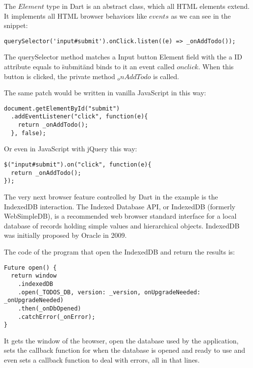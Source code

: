 The $Element$ type in Dart \cite{4_9} is an
abstract class, which all HTML elements extend. It implements all HTML browser
behaviors like $events$ as we can see in the snippet:

\begin{verbatim}
querySelector('input#submit').onClick.listen((e) => _onAddTodo());  
\end{verbatim}

The querySelector method matches a Input button Element field with the a ID
attribute equals to \"submit\" and binds to it an event called $onclick$. When
this button is clicked, the private method $_onAddTodo$ is called.

The same patch would be written in vanilla JavaScript in this way:

\begin{lstlisting}[label=jset,caption=Vanilla JavaScript translation]
document.getElementById("submit")
  .addEventListener("click", function(e){
    return _onAddTodo();
  }, false);
\end{lstlisting}

Or even in JavaScript with jQuery this way:

\begin{lstlisting}[label=jjqt,caption=JavaScript with jQuery translation]
$("input#submit").on("click", function(e){
  return _onAddTodo();
});
\end{lstlisting}

The very next browser feature controlled by Dart in the example is the
IndexedDB \cite{4_10} interaction. The Indexed
Database API, or IndexedDB (formerly  WebSimpleDB), is a recommended web browser
standard interface for a local database of records holding simple values and
hierarchical objects. IndexedDB was initially proposed by Oracle in 2009.

The code of the program that open the IndexedDB and return the results is:

\begin{lstlisting}[label=dffexp,caption=Dart open's IndexedDB and return results]
Future open() {
  return window
    .indexedDB
    .open(_TODOS_DB, version: _version, onUpgradeNeeded: _onUpgradeNeeded)
    .then(_onDbOpened)
    .catchError(_onError);
}
\end{lstlisting}

It gets the window of the browser, open the database used by the application,
sets the callback function for when the database is opened and ready to use and
even sets a callback function to deal with errors, all in that lines.

